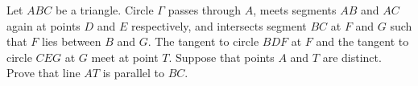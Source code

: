 Let $ABC$ be a triangle. Circle $\Gamma$ passes through $A$, meets segments $AB$ and $AC$ again at points $D$ and $E$ respectively, and intersects segment $BC$ at $F$ and $G$ such that $F$ lies between $B$ and $G$. The tangent to circle $BDF$ at $F$ and the tangent to circle $CEG$ at $G$ meet at point $T$. Suppose that points $A$ and $T$ are distinct. Prove that line $AT$ is parallel to $BC$.
